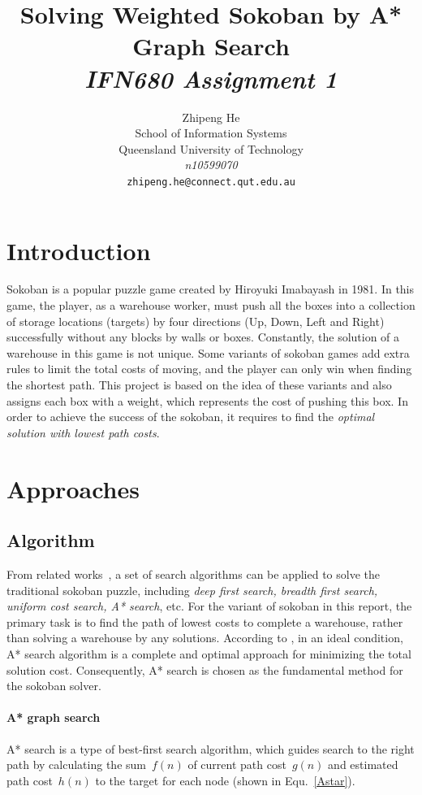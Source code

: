\documentclass{article}
\title{Solving Weighted Sokoban by A* Graph Search \\
{\sl \Large IFN680 Assignment 1}}
\author{
 Zhipeng He \\
  School of Information Systems\\
  Queensland University of Technology\\
  \textit{n10599070} \\
  \texttt{zhipeng.he@connect.qut.edu.au} \\
}
\begin{document}
\maketitle


\section{Introduction}
Sokoban is a popular puzzle game created by Hiroyuki Imabayash in 1981. In this game, the player, as a warehouse worker, must push all the boxes into a collection of storage locations (targets) by four directions (Up, Down, Left and Right) successfully without any blocks by walls or boxes. Constantly, the solution of a warehouse in this game is not unique. Some variants of sokoban games add extra rules to limit the total costs of moving, and the player can only win when finding the shortest path. This project is based on the idea of these variants and also assigns each box with a weight, which represents the cost of pushing this box. In order to achieve the success of the sokoban, it requires to find the {\it optimal solution with lowest path costs}. 

\section{Approaches}

\subsection{Algorithm}

From related works~\cite{venkatesan2018ai}, a set of search algorithms can be applied to solve the traditional sokoban puzzle, including \textit{deep first search, breadth first search, uniform cost search, A* search}, etc. For the variant of sokoban in this report, the primary task is to find the path of lowest costs to complete a warehouse, rather than solving a warehouse by any solutions. According to \cite{AIAMA}, in an ideal condition, A* search algorithm is a complete and optimal approach for minimizing the total solution cost. Consequently, A* search is chosen as the fundamental method for the sokoban solver.


\paragraph{A* graph search}

A* search is a type of best-first search algorithm, which guides search to the right path by calculating the sum~$f(n)$ of current path cost~$g(n)$ and estimated path cost~$h(n)$ to the target for each node (shown in Equ.~\ref{Astar}). 
\end{document}

